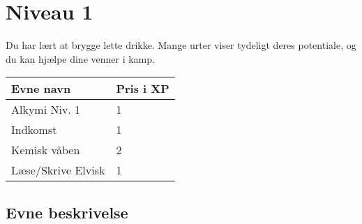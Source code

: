 \chapter*{Niveau 1}
Du har lært at brygge lette drikke. Mange urter viser tydeligt deres potentiale, og du kan hjælpe dine venner i kamp.
\begin{table}[H]
    \centering
    \begin{tabular}{|p{}|p{}|}
    \rowcolor{cerulean!80}\hline
        Evne navn & Pris i XP \\\hline
         Alkymi Niv. 1 & 1 \\\hline
         Indkomst & 1 \\\hline
         Kemisk våben & 2 \\\hline
         Læse/Skrive Elvisk & 1\\
         \hline
    \end{tabular}
\end{table}

\section*{Evne beskrivelse}








